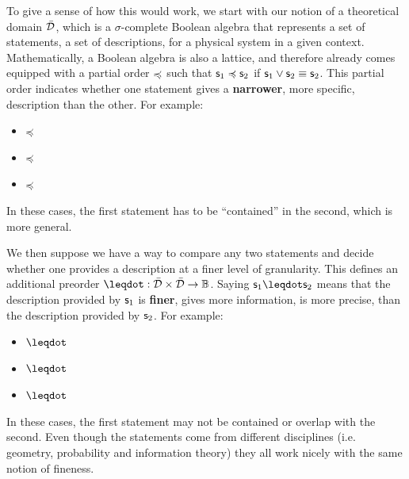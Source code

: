 \documentclass[10pt, onecolumn, longbibliography, nofootinbib]{revtex4-2}
\begin{document}
To give a sense of how this would work, we start with our notion of a theoretical domain $\bar{\mathcal{D}}$, which is a $\sigma$-complete Boolean algebra that represents a set of statements, a set of descriptions, for a physical system in a given context. Mathematically, a Boolean algebra is also a lattice, and therefore already comes equipped with a partial order $\preccurlyeq$ such that $\mathsf{s}_1 \preccurlyeq \mathsf{s}_2$ if $\mathsf{s}_1 \vee \mathsf{s}_2 \equiv \mathsf{s}_2$. This partial order indicates whether one statement gives a \textbf{narrower}, more specific, description than the other. For example:
\begin{itemize}
    \item {} $\preccurlyeq$ 
    \item {} $\preccurlyeq$ 
    \item {} $\preccurlyeq$ 
\end{itemize}
In these cases, the first statement has to be ``contained'' in the second, which is more general.

We then suppose we have a way to compare any two statements and decide whether one provides a description at a finer level of granularity. This defines an additional preorder $\finer : \tdomain \times \tdomain \to \mathbb{B}$. Saying $\stmt_1 \finer \stmt_2$ means that the description provided by $\mathsf{s}_1$ is \textbf{finer}, gives more information, is more precise, than the description provided by $\mathsf{s}_2$. For example:
\begin{itemize}
    \item {} $\finer$ 
    \item {} $\finer$ 
    \item {} $\finer$ 
\end{itemize}
In these cases, the first statement may not be contained or overlap with the second. Even though the statements come from different disciplines (i.e. geometry, probability and information theory) they all work nicely with the same notion of fineness.
\end{document}
